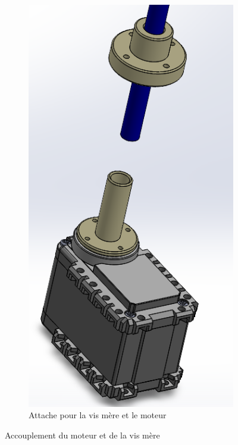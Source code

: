 \documentclass[a4paper, 11pt]{report}
\begin{document}
\begin{figure}
\begin{subfigure}[t]{0.3\textwidth}
                    \includegraphics[width=\textwidth]{Figures/attache.png}
                    \caption{Attache pour la vis mère et le moteur}
                    \label{fig:inspiration_vis_ecrou}
                \end{subfigure}
                \caption{Accouplement du moteur et de la vis mère}
            \end{figure}
\end{document}

